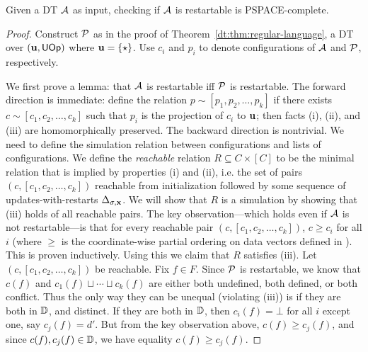 \begin{theorem}
Given a DT $\mathcal{A}$ as input,
checking if $\mathcal{A}$ is restartable is PSPACE-complete.
\label{dt:thm:restartable-pspace-complete}
\end{theorem}
\begin{proof}
Construct $\mathcal{P}$ as in the proof of Theorem~\ref{dt:thm:regular-language}, a DT over $(\mathbf{u}, \textsf{UOp})$ where $\mathbf{u} = \{\star\}$.
Use $c_i$ and $p_i$ to denote configurations of $\mathcal{A}$ and $\mathcal{P}$, respectively.

We first prove a lemma: that $\mathcal{A}$ is restartable iff $\mathcal{P}$ is restartable.
The forward direction is immediate:
define the relation $p \sim [p_1, p_2, \ldots, p_k]$
if there exists $c \sim [c_1, c_2, \ldots, c_k]$
such that $p_i$ is the projection of $c_i$ to $\mathbf{u}$;
then facts (i), (ii), and (iii) are homomorphically preserved.
The backward direction is nontrivial.
We need to define the simulation relation
between configurations and lists of configurations.
We define the \emph{reachable} relation $R \subseteq C \times [C]$
to be the minimal relation that is implied by properties (i) and (ii), i.e. the set of pairs
$(c, [c_1, c_2, \ldots, c_k])$ reachable from initialization followed
by some sequence of updates-with-restarts $\Delta_{\sigma,\mathbf{x}}$.
We will show that $R$ is a simulation by showing that
(iii) holds of all reachable pairs.
The key observation---which holds even if
$\mathcal{A}$ is not restartable---is that for every reachable pair
$(c, [c_1, c_2, \ldots, c_k])$,
$c \ge c_i$ for all $i$ (where $\ge$ is the coordinate-wise partial ordering on data vectors defined in ).
This is proven inductively.
Using this we claim that $R$ satisfies (iii).
Let $(c, [c_1, c_2, \ldots, c_k])$ be reachable.
Fix $f \in F$.
Since $\mathcal{P}$ is restartable, we know that
$c(f)$ and $c_1(f) \sqcup \cdots \sqcup c_k(f)$ are either both undefined, both defined, or both conflict.
Thus the only way they can be unequal (violating (iii)) is if they are both in $\mathbb{D}$, and distinct.
If they are both in $\mathbb{D}$, then $c_i(f) = \bot$ for all $i$ except one, say $c_j(f) = d'$.
But from the key observation above, $c(f) \ge c_j(f)$, and since $c(f), c_j(f) \in \mathbb{D}$, we have equality $c(f) \ge c_j(f)$.


\end{proof}

